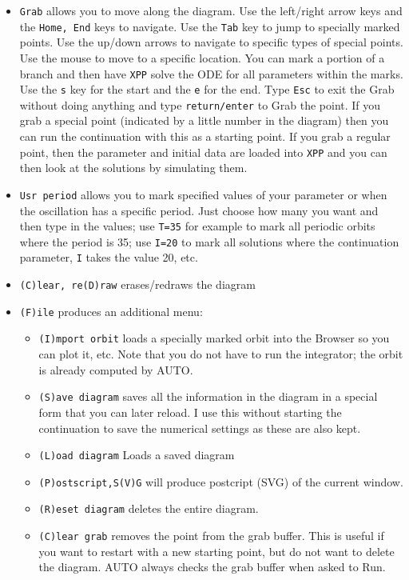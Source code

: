 \documentclass{article}
\begin{document}
\begin{itemize}
\item {\tt Grab} allows you to move along the diagram. Use the left/right arrow keys and the {\tt Home, End} keys to navigate. Use the {\tt Tab} key to jump to specially marked points. Use the up/down arrows to navigate to specific types of special points. Use the mouse to move to a specific location. You can mark a portion of a branch and then have {\tt XPP} solve the ODE for all parameters within the marks. Use the {\tt s} key for the start and the {\tt e} for the end. Type {\tt Esc} to exit the Grab without doing anything and type {\tt return/enter} to Grab the point. If you grab a special point (indicated by a little number in the diagram) then you can run the continuation with this as a starting point. If you grab a regular point, then the parameter and initial data are loaded into {\tt XPP} and you can then look at the solutions by simulating them.
\item {\tt Usr period} allows you to mark specified values of your parameter or when the oscillation has a specific period. Just choose how many you want and then type in the values; use {\tt T=35} for example to mark all periodic orbits where the period is 35; use {\tt I=20} to mark all solutions where the continuation parameter, {\tt I} takes the value 20, etc. 
\item {\tt (C)lear, re(D)raw} erases/redraws the diagram
\item {\tt (F)ile} produces an additional menu:
\begin{itemize}
\item {\tt (I)mport orbit} loads a specially marked orbit into the Browser so you can plot it, etc. Note that you do not have to run the integrator; the orbit is already computed by AUTO.
\item {\tt (S)ave diagram} saves all the information in the diagram in a special form that you can later reload. I use this without starting the continuation to save the numerical settings as these are also kept. 
\item {\tt (L)oad diagram} Loads a saved diagram
\item {\tt (P)ostscript,S(V)G} will produce postcript (SVG) of the current window.
\item {\tt (R)eset diagram} deletes the entire diagram.
\item {\tt (C)lear grab} removes the point from the grab buffer. This is useful if you want to restart with a new starting point, but do not want to delete the diagram. AUTO always checks the grab buffer when asked to Run.

\end{itemize}
\end{itemize}
\end{document}
